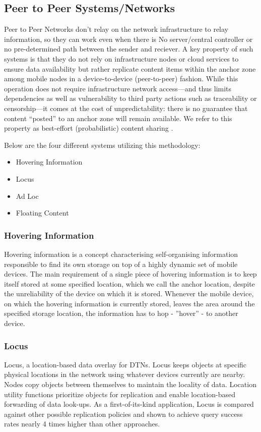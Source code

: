 \subsection{Peer to Peer Systems/Networks}
Peer to Peer Networks don't relay on the network infrastructure to relay information, so they can work even when there is No server/central controller or no pre-determined path between the sender and reciever. A key property of such systems is that they do not rely on infrastructure nodes or cloud services to ensure data availability but rather replicate content items within the anchor zone among mobile nodes in a device-to-device (peer-to-peer) fashion. While this operation does not require infrastructure network access—and thus limits dependencies as well as vulnerability to third party actions such as traceability or censorship—it comes at the cost of unpredictability: there is no guarantee that content “posted” to an anchor zone will remain available. We refer to this property as best-effort (probabilistic) content sharing \cite{geo-based-content-sharing}.

Below are the four different systems utilizing this methodology:
\begin{itemize}
  \item Hovering Information
  \item Locus
  \item Ad Loc
  \item Floating Content
\end{itemize}

\subsubsection{Hovering Information \cite{Castro2009}} 
Hovering information is a concept characterising self-organising information responsible to find its own storage on top of a highly dynamic set of mobile devices. The main requirement of a single piece of hovering information is to keep itself stored at some specified location, which we call the anchor location, despite the unreliability of the device on which it is stored. Whenever the mobile device, on which the hovering information is currently stored, leaves the area around the specified storage location, the information has to hop - ”hover” - to another device.
\subsubsection{Locus \cite{Thompson:2010:LLD:1859934.1859945}} 
Locus, a location-based data overlay for DTNs. Locus keeps objects at specific physical locations in the network using whatever devices currently are nearby. Nodes copy objects between themselves to maintain the locality of data. Location utility functions prioritize objects for replication and enable location-based forwarding of data look-ups. As a first-of-its-kind application, Locus is compared against other possible replication policies and shown to achieve query success rates nearly 4 times higher than other approaches.
